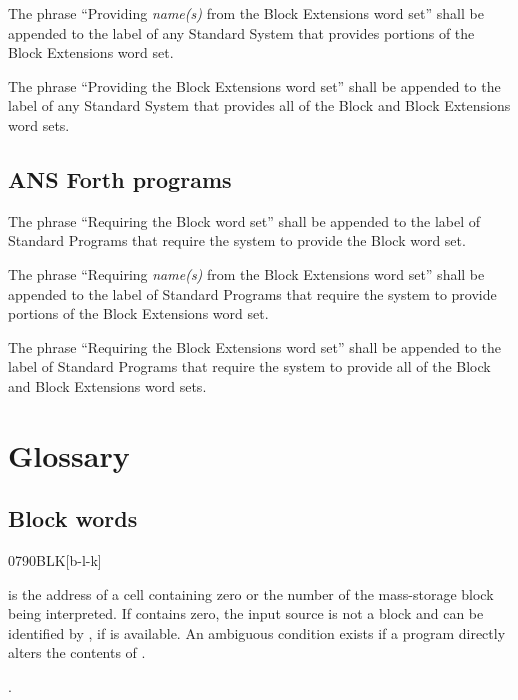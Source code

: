 The phrase ``Providing \emph{name(s)} from the Block Extensions
word set'' shall be appended to the label of any Standard System
that provides portions of the Block Extensions word set.

The phrase ``Providing the Block Extensions word set'' shall be
appended to the label of any Standard System that provides all of
the Block and Block Extensions word sets.

\subsection{ANS Forth programs} %

The phrase ``Requiring the Block word set'' shall be appended to
the label of Standard Programs that require the system to provide
the Block word set.

The phrase ``Requiring \emph{name(s)} from the Block Extensions
word set'' shall be appended to the label of Standard Programs
that require the system to provide portions of the Block Extensions
word set.

The phrase ``Requiring the Block Extensions word set'' shall be
appended to the label of Standard Programs that require the system
to provide all of the Block and Block Extensions word sets.


\section{Glossary} %

\subsection{Block words} %

\begin{worddef}{0790}{BLK}[b-l-k]
\item {}

	 is the address of a cell containing zero or the
	number of the mass-storage block being interpreted. If
	 contains zero, the input source is not a block and
	can be identified by , if
	 is available. An ambiguous condition
	exists if a program directly alters the contents of .

\see {}.
\end{worddef}


